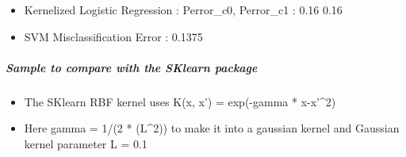 \documentclass[11pt]{article}
\providecommand{\tightlist}{%
      \setlength{\itemsep}{0pt}\setlength{\parskip}{0pt}}
\begin{document}
\begin{itemize}
\tightlist
\item
  Kernelized Logistic Regression : Perror\_c0, Perror\_c1 : 0.16 0.16
\item
  SVM Misclassification Error : 0.1375
\end{itemize}

\subparagraph{Sample to compare with the SKlearn
package}\label{sample-to-compare-with-the-sklearn-package}

\begin{itemize}
\tightlist
\item
  The SKlearn RBF kernel uses K(x, x') = exp(-gamma *
  \textbar{}\textbar{}x-x'\textbar{}\textbar{}\^{}2)
\item
  Here gamma = 1/(2 * (L\^{}2)) to make it into a gaussian kernel and
  Gaussian kernel parameter L = 0.1
\end{itemize}
\end{document}
